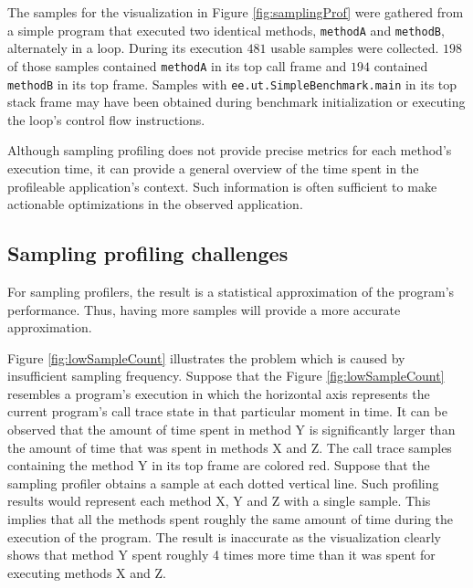 \documentclass[..thesis.tex]{subfiles}
\begin{document}
The samples for the visualization in Figure \ref{fig:samplingProf} were gathered from a simple program that executed two identical methods, \texttt{methodA} and \texttt{methodB}, alternately in a loop. During its execution $481$ usable samples were collected. $198$ of those samples contained \texttt{methodA} in its top call frame and $194$ contained \texttt{methodB} in its top frame. Samples with \texttt{ee.ut.SimpleBenchmark.main} in its top stack frame may have been obtained during benchmark initialization or executing the loop's control flow instructions.

Although sampling profiling does not provide precise metrics for each method's execution time, it can provide a general overview of the time spent in the profileable application's context. Such information is often sufficient to make actionable optimizations in the observed application.

\subsection{Sampling profiling challenges}

For sampling profilers, the result is a statistical approximation of the program's performance. Thus, having more samples will provide a more accurate approximation. 

Figure \ref{fig:lowSampleCount} illustrates the problem which is caused by insufficient sampling frequency. Suppose that the Figure \ref{fig:lowSampleCount} resembles a program's execution in which the horizontal axis represents the current program's call trace state in that particular moment in time. It can be observed that the amount of time spent in method Y is significantly larger than the amount of time that was spent in methods X and Z. The call trace samples containing the method Y in its top frame are colored red. Suppose that the sampling profiler obtains a sample at each dotted vertical line. Such profiling results would represent each method X, Y and Z with a single sample. This implies that all the methods spent roughly the same amount of time during the execution of the program. The result is inaccurate as the visualization clearly shows that method Y spent roughly 4 times more time than it was spent for executing methods X and Z.
\end{document}
